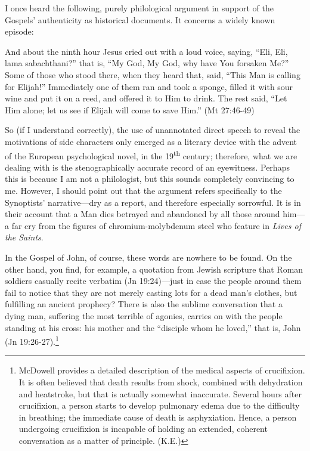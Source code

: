 I once heard the following, purely philological argument in support of the Gospels' authenticity as historical documents. It concerns a widely known episode:

\begin{smallquote}
    And about the ninth hour Jesus cried out with a loud voice, saying, ``Eli, Eli, lama sabachthani?'' that is, ``My God, My God, why have You forsaken Me?'' Some of those who stood there, when they heard that, said, ``This Man is calling for Elijah!'' Immediately one of them ran and took a sponge, filled it with sour wine and put it on a reed, and offered it to Him to drink. The rest said, ``Let Him alone; let us see if Elijah will come to save Him.'' (Mt 27:46-49)
\end{smallquote}

So (if I understand correctly), the use of unannotated direct speech to reveal the motivations of side characters only emerged as a literary device with the advent of the European psychological novel, in the 19\textsuperscript{th} century; therefore, what we are dealing with is the stenographically accurate record of an eyewitness. Perhaps this is because I am not a philologist, but this sounds completely convincing to me. However, I should point out that the argument refers specifically to the Synoptists' narrative---dry as a report, and therefore especially sorrowful. It is in their account that a Man dies betrayed and abandoned by all those around him---a far cry from the figures of chromium-molybdenum steel who feature in \emph{Lives of the Saints}.

In the Gospel of John, of course, these words are nowhere to be found. On the other hand, you find, for example, a quotation from Jewish scripture that Roman soldiers casually recite verbatim (Jn 19:24)---just in case the people around them fail to notice that they are not merely casting lots for a dead man's clothes, but fulfilling an ancient prophecy? There is also the sublime conversation that a dying man, suffering the most terrible of agonies, carries on with the people standing at his cross: his mother and the ``disciple whom he loved,'' that is, John (Jn
19:26-27).\footnote{McDowell provides a detailed description of the medical aspects of crucifixion. It is often believed that death results from shock, combined with dehydration and heatstroke, but that is actually somewhat inaccurate. Several hours after crucifixion, a person starts to develop pulmonary edema due to the difficulty in breathing; the immediate cause of death is asphyxiation. Hence, a person undergoing crucifixion is incapable of holding an extended, coherent conversation as a matter of principle. (K.E.)}

